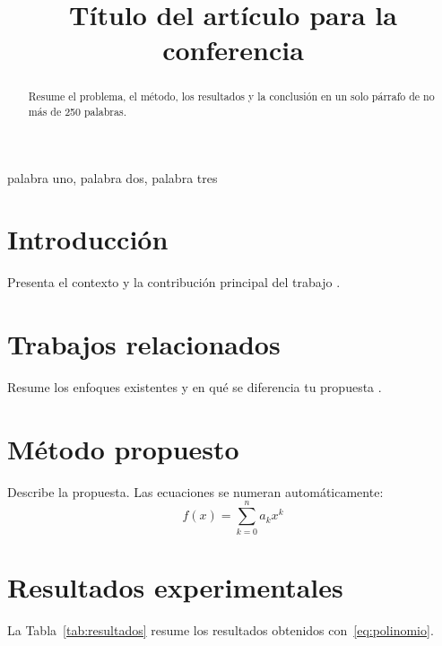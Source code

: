 \documentclass[conference]{IEEEtran}
\begin{document}
\title{Título del artículo para la conferencia}

\author{
  \and
}

\maketitle

\begin{abstract}
Resume el problema, el método, los resultados y la conclusión en un solo párrafo
de no más de 250 palabras.
\end{abstract}

\begin{IEEEkeywords}
palabra uno, palabra dos, palabra tres
\end{IEEEkeywords}

\section{Introducción}
Presenta el contexto y la contribución principal del trabajo \cite{lamport1994}.

\section{Trabajos relacionados}
Resume los enfoques existentes y en qué se diferencia tu propuesta \cite{knuth1984}.

\section{Método propuesto}
Describe la propuesta. Las ecuaciones se numeran automáticamente:
\begin{equation}
  f(x) = \sum_{k=0}^{n} a_k x^k
  \label{eq:polinomio}
\end{equation}

\section{Resultados experimentales}
La Tabla~\ref{tab:resultados} resume los resultados obtenidos con~\eqref{eq:polinomio}.
\end{document}
